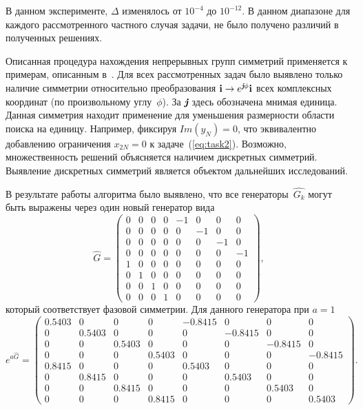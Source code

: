 \documentclass{llncs}
\begin{document}
В данном эксперименте, $\Delta$ изменялось от $ 10^{-4} $ до $ 10^{-12} $. В данном диапазоне для каждого рассмотренного частного случая задачи, не было получено различий в полученных решениях.


Описанная процедура нахождения непрерывных групп симметрий применяется к примерам, описанным в~\cite{tyunin:daor}. Для всех рассмотренных задач было выявлено только наличие симметрии относительно преобразования $\textbf{i} \to e^{\emph{\textbf{j}}\phi}\textbf{i}$ всех комплексных координат (по произвольному углу~$\phi$). За $\emph{\textbf{j}}$ здесь обозначена мнимая единица. Данная симметрия находит применение для уменьшения размерности области поиска на единицу. Например, фиксируя $Im(y_{N})=0$, что эквивалентно добавлению ограничения $x_{2N}=0$ к задаче~(\ref{eq:task2}). Возможно, множественность решений объясняется наличием дискретных симметрий. Выявление дискретных симметрий является объектом дальнейших исследований.

В результате работы алгоритма было выявлено, что все генераторы~$\hat{G_k}$ могут быть выражены через один новый генератор вида
$$
\hat{G} = \left(\begin{array}{cccccccc}
        0 & 0 & 0 & 0 & -1 & 0 & 0 & 0\\
        0 & 0 & 0 & 0 & 0 & -1 & 0 & 0\\
        0 & 0 & 0 & 0 & 0 & 0 & -1 & 0\\
        0 & 0 & 0 & 0 & 0 & 0 & 0 & -1\\
        1 & 0 & 0 & 0 & 0 & 0 & 0 & 0\\
        0 & 1 & 0 & 0 & 0 & 0 & 0 & 0\\
        0 & 0 & 1 & 0 & 0 & 0 & 0 & 0\\
        0 & 0 & 0 & 1 & 0 & 0 & 0 & 0
\end{array}\right),
$$
который соответствует фазовой симметрии. Для данного генератора при $a = 1$
$$e^{a\hat{G}} = \left(\begin{array}{cccccccc}
        0.5403 & 0 & 0 & 0 & -0.8415 & 0 & 0 & 0\\
        0 & 0.5403 & 0 & 0 & 0 & -0.8415 & 0 & 0\\
        0 & 0 & 0.5403 & 0 & 0 & 0 & -0.8415 & 0\\
        0 & 0 & 0 & 0.5403 & 0 & 0 & 0 & -0.8415\\
        0.8415 & 0 & 0 & 0 & 0.5403 & 0 & 0 & 0\\
        0 & 0.8415 & 0 & 0 & 0 & 0.5403 & 0 & 0\\
        0 & 0 & 0.8415 & 0 & 0 & 0 & 0.5403 & 0\\
        0 & 0 & 0 & 0.8415 & 0 & 0 & 0 & 0.5403
\end{array}\right).
$$


\end{document}
